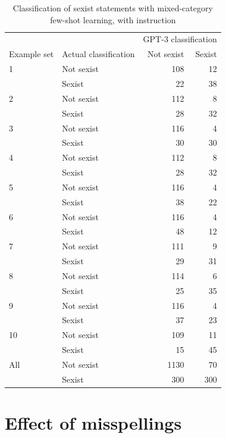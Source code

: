 \documentclass[12pt,]{article}
\begin{document}
\begin{table}[!h]

\caption{\label{tab:fewshotmixedinstruct-sexism}Classification of sexist statements with mixed-category few-shot learning, with instruction}
\centering
\fontsize{8}{10}\selectfont
\begin{tabular}[t]{llrr}
\toprule
\multicolumn{2}{c}{ } & \multicolumn{2}{c}{GPT-3 classification} \\
\cmidrule(l{3pt}r{3pt}){3-4}
Example set & Actual classification & Not sexist & Sexist\\
\midrule
1 & Not sexist & 108 & 12\\
 & Sexist & 22 & 38\\
\midrule
2 & Not sexist & 112 & 8\\
 & Sexist & 28 & \vphantom{1} 32\\
\midrule
3 & Not sexist & 116 & 4\\
 & Sexist & 30 & 30\\
\midrule
4 & Not sexist & 112 & 8\\
 & Sexist & 28 & 32\\
\midrule
5 & Not sexist & 116 & 4\\
 & Sexist & 38 & 22\\
\midrule
6 & Not sexist & 116 & 4\\
 & Sexist & 48 & 12\\
\midrule
7 & Not sexist & 111 & 9\\
 & Sexist & 29 & 31\\
\midrule
8 & Not sexist & 114 & 6\\
 & Sexist & 25 & 35\\
\midrule
9 & Not sexist & 116 & 4\\
 & Sexist & 37 & 23\\
\midrule
10 & Not sexist & 109 & 11\\
 & Sexist & 15 & 45\\
\midrule
All & Not sexist & 1130 & 70\\
 & Sexist & 300 & 300\\
\bottomrule
\end{tabular}
\end{table}

\newpage

\hypertarget{appendxc}{%
\section{Effect of misspellings}\label{appendxc}}
\end{document}

